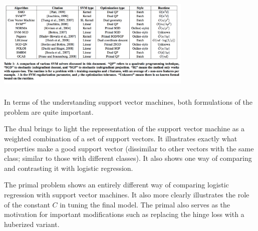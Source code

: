 \documentclass[xetex,mathserif,serif,aspectratio=169]{beamer}
\begin{document}
\begin{frame}[fragile] \frametitle{} \oldB \small

\begin{center}
\includegraphics[width=0.7\textwidth]{img/methodCompare.pdf}
\end{center}

\end{frame}

\begin{frame}[fragile] \frametitle{} \oldB \small

\textbf{}

In terms of the understanding support vector machines, both
formulations of the problem are quite important.

The dual
brings to light the representation of the support vector
machine as a weighted combination of a set of support vectors.
It illustrates exactly what properties make a good support
vector (dissimilar to other vectors with the same class; similar
to those with different classes). It also shows one way of
comparing and contrasting it with logistic regression.

The primal problem shows an entirely different way of comparing
logistic regression with support vector machines. It also
more clearly illustrates the role of the constant $C$ in
tuning the final model. The primal also serves as the motivation
for important modifications such as replacing the hinge loss
with a huberized variant.

\end{frame}
\end{document}
